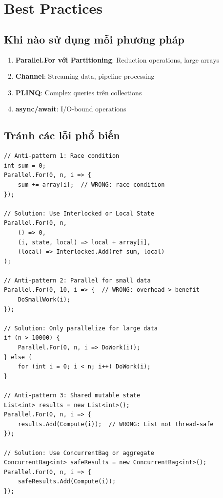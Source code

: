\section{Best Practices}

\subsection{Khi nào sử dụng mỗi phương pháp}

\begin{enumerate}
    \item \textbf{Parallel.For với Partitioning}: Reduction operations, large arrays
    \item \textbf{Channel}: Streaming data, pipeline processing
    \item \textbf{PLINQ}: Complex queries trên collections
    \item \textbf{async/await}: I/O-bound operations
\end{enumerate}

\subsection{Tránh các lỗi phổ biến}

\begin{lstlisting}[style=csharpstyle, caption={Anti-patterns và Solutions}, label={lst:antipatterns}]
// Anti-pattern 1: Race condition
int sum = 0;
Parallel.For(0, n, i => {
    sum += array[i];  // WRONG: race condition
});

// Solution: Use Interlocked or Local State
Parallel.For(0, n, 
    () => 0,
    (i, state, local) => local + array[i],
    (local) => Interlocked.Add(ref sum, local)
);

// Anti-pattern 2: Parallel for small data
Parallel.For(0, 10, i => {  // WRONG: overhead > benefit
    DoSmallWork(i);
});

// Solution: Only parallelize for large data
if (n > 10000) {
    Parallel.For(0, n, i => DoWork(i));
} else {
    for (int i = 0; i < n; i++) DoWork(i);
}

// Anti-pattern 3: Shared mutable state
List<int> results = new List<int>();
Parallel.For(0, n, i => {
    results.Add(Compute(i));  // WRONG: List not thread-safe
});

// Solution: Use ConcurrentBag or aggregate
ConcurrentBag<int> safeResults = new ConcurrentBag<int>();
Parallel.For(0, n, i => {
    safeResults.Add(Compute(i));
});
\end{lstlisting}


